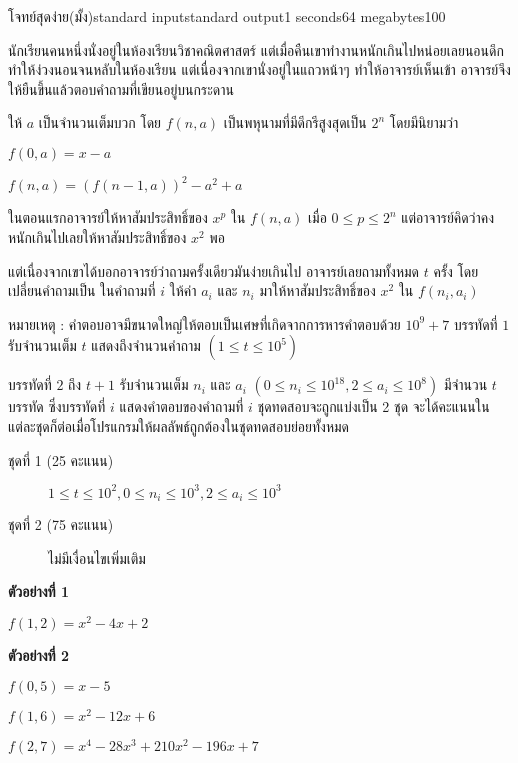 \documentclass[11pt,a4paper]{article}
\begin{document}
\begin{problem}{โจทย์สุดง่าย(มั้ง)}{standard input}{standard output}{1 seconds}{64 megabytes}{100}

นักเรียนคนหนึ่งนั่งอยู่ในห้องเรียนวิชาคณิตศาสตร์ แต่เมื่อคืนเขาทำงานหนักเกินไปหน่อยเลยนอนดึกทำให้ง่วงนอนจนหลับในห้องเรียน แต่เนื่องจากเขานั่งอยู่ในแถวหน้าๆ ทำให้อาจารย์เห็นเข้า อาจารย์จึงให้ยืนขึ้นแล้วตอบคำถามที่เขียนอยู่บนกระดาน

ให้ $a$ เป็นจำนวนเต็มบวก โดย $f(n , a)$ เป็นพหุนามที่มีดีกรีสูงสุดเป็น $2^{n}$ โดยมีนิยามว่า 
\begin{center}

$f(0 , a) = x - a$ 

$f(n , a) = (f(n-1 , a))^2 - a^2 + a$  

\end{center}

ในตอนแรกอาจารย์ให้หาสัมประสิทธิ์ของ $x^p$ ใน $f(n , a)$ เมื่อ $0 \leq p \leq 2^n$ แต่อาจารย์คิดว่าคงหนักเกินไปเลยให้หาสัมประสิทธิ์ของ $x^2$ พอ

แต่เนื่องจากเขาได้บอกอาจารย์ว่าถามครั้งเดียวมันง่ายเกินไป อาจารย์เลยถามทั้งหมด $t$ ครั้ง โดยเปลี่ยนคำถามเป็น
ในคำถามที่ $i$ ให้ค่า $a_i$ และ $n_i$ มาให้หาสัมประสิทธิ์ของ $x^2$ ใน $f(n_i , a_i)$ 

หมายเหตุ : คำตอบอาจมีขนาดใหญ่ให้ตอบเป็นเศษที่เกิดจากการหารคำตอบด้วย $10^9 + 7$
\InputFile
บรรทัดที่ $1$ รับจำนวนเต็ม $t$ แสดงถึงจำนวนคำถาม $(1 \leq t \leq 10^5)$

บรรทัดที่ $2$ ถึง $t + 1$ รับจำนวนเต็ม $n_i$ และ $a_i$ $(0 \leq n_i \leq10^{18} , 2 \leq a_i \leq 10^8)$
\OutputFile
มีจำนวน $t$ บรรทัด ซึ่งบรรทัดที่ $i$ แสดงคำตอบของคำถามที่ $i$ 
\Scoring
ชุดทดสอบจะถูกแบ่งเป็น 2 ชุด จะได้คะแนนในแต่ละชุดก็ต่อเมื่อโปรแกรมให้ผลลัพธ์ถูกต้องในชุดทดสอบย่อยทั้งหมด

\begin{description}

\item[ชุดที่ 1 (25 คะแนน)]  $1 \leq t \leq 10^2 , 0 \leq n_i \leq 10^3 , 2 \leq a_i \leq 10^3$ 

\item[ชุดที่ 2 (75 คะแนน)] ไม่มีเงื่อนไขเพิ่มเติม

\end{description}

\Examples

\begin{example}
%
%
\end{example}

\Note
\begin{note}
\textbf{ตัวอย่างที่ 1}

$f(1, 2) = x^2 -4x+ 2$

\textbf{ตัวอย่างที่ 2}

$f(0,5)=x - 5$

$f(1,6)=x^2 - 12 x + 6$

$f(2,7)= x^4 - 28 x^3 + 210 x^2 - 196 x + 7$
\end{note}

\end{problem}
\end{document}
